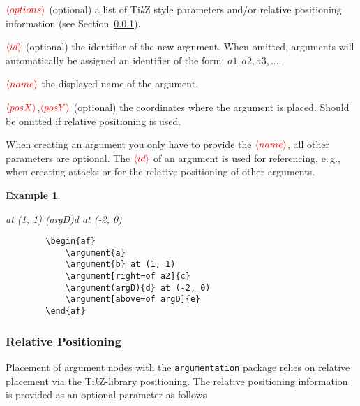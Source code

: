 \documentclass[headings=normal]{scrartcl}
\newcommand{\tikzname}{Ti\emph{k}Z\xspace}
\newcommand{\argumentation}{\texttt{argumentation}\xspace}
\newcommand{\opt}[2][red]{\ensuremath{\textcolor{#1}{\langle #2\rangle}}}
\newtheorem{example}{Example}
\newcommand{\makecmd}[1]{\textbackslash\hspace{-1ex}#1}
\newenvironment{command}[1]{
    \medskip\medskip
    \hspace{-1.5cm}{\ttfamily \makecmd{#1}}
    \begin{description}[labelindent=1.5cm,labelsep=0.5em, align=right]
}{%
    \end{description}
    \medskip
}
\begin{document}
    \begin{command}{
        argument[\opt{options}](\opt{id})\{\opt{name}\} at (\opt{posX}, \opt{posY})
    }
        \item[\opt{options}] (optional) a list of \tikzname style parameters and/or relative positioning information (see Section~\ref{sec:relpos}).
        \item[\opt{id}] (optional) the identifier of the new argument. When omitted, arguments will automatically be assigned an identifier of the form: $a1, a2, a3,...$.
        \item[\opt{name}] the displayed name of the argument.
        \item[\opt{posX},\opt{posY}] (optional) the coordinates where the argument is placed. Should be omitted if relative positioning is used.
    \end{command}
        
    When creating an argument you only have to provide the \opt{name}, all other parameters are optional.
    The \opt{id} of an argument is used for referencing, e.\,g., when creating attacks or for the relative positioning of other arguments.

\begin{example}~

    \begin{minipage}{0.35\textwidth}
    \begin{center}
        \begin{af}
             at (1, 1)
            \argument(argD){d} at (-2, 0)
        \end{af}
    \end{center}
    \end{minipage}
    \begin{minipage}{0.5\textwidth}
    \begin{verbatim}
        \begin{af}
            \argument{a}
            \argument{b} at (1, 1)
            \argument[right=of a2]{c}
            \argument(argD){d} at (-2, 0)
            \argument[above=of argD]{e}
        \end{af}
    \end{verbatim}
    \end{minipage}%
\end{example}

\subsubsection{Relative Positioning}\label{sec:relpos}
    Placement of argument nodes with the \argumentation package relies on relative placement via the \tikzname-library \textsf{positioning}.
    The relative positioning information is provided as an optional parameter as follows\\
\end{document}
